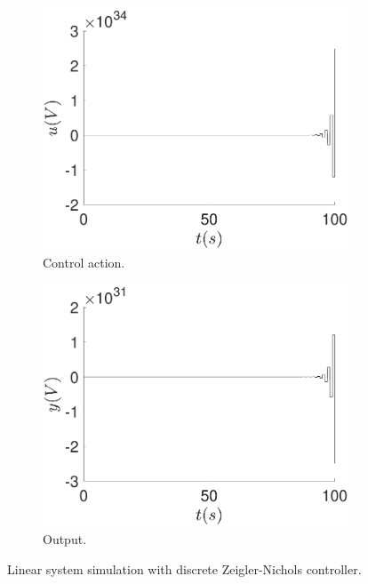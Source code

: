     \begin{figure}
        \centering
        \begin{subfigure}[b]{0.475\textwidth}
            \centering
            \includegraphics[scale=0.425]{files/heuristic/zeigler/plot_control_zeigler_linear.pdf}
            \caption{Control action.}
        \end{subfigure}
        \vskip0.1cm
        \begin{subfigure}[b]{0.475\textwidth}   
            \centering 
            \includegraphics[scale=0.425]{files/heuristic/zeigler/plot_y_zeigler_linear.pdf}
            \caption{Output.}
        \end{subfigure}
        \caption{Linear system simulation with discrete Zeigler-Nichols controller.}
        \label{fig:zeigler_linear}
	\end{figure}
	
